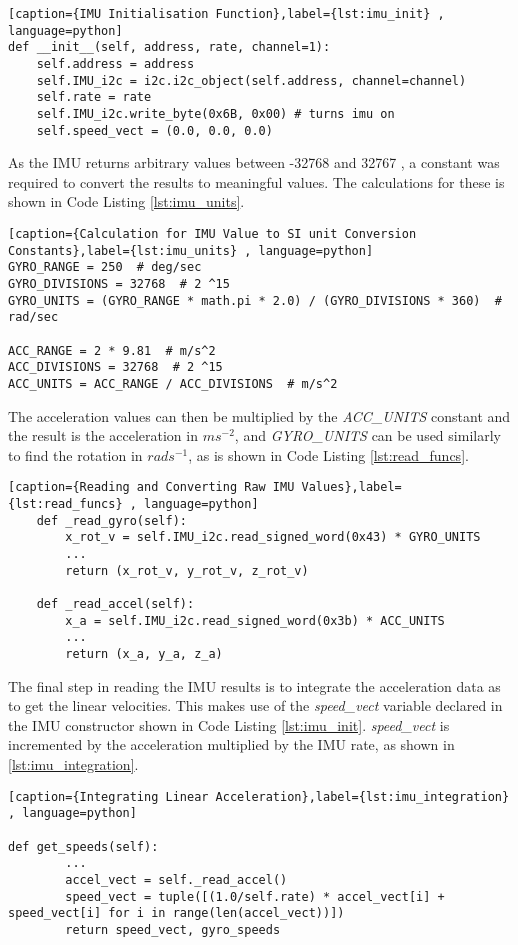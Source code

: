 \begin{lstlisting}[caption={IMU Initialisation Function},label={lst:imu_init} , language=python]
def __init__(self, address, rate, channel=1):
    self.address = address
    self.IMU_i2c = i2c.i2c_object(self.address, channel=channel)
    self.rate = rate
    self.IMU_i2c.write_byte(0x6B, 0x00) # turns imu on
    self.speed_vect = (0.0, 0.0, 0.0)
\end{lstlisting}

As the IMU returns arbitrary values between -32768 and 32767 , a constant was required to convert the results to meaningful values. The calculations for these is shown in Code Listing \ref{lst:imu_units}. 

\begin{lstlisting}[caption={Calculation for IMU Value to SI unit Conversion Constants},label={lst:imu_units} , language=python]
GYRO_RANGE = 250  # deg/sec
GYRO_DIVISIONS = 32768  # 2 ^15
GYRO_UNITS = (GYRO_RANGE * math.pi * 2.0) / (GYRO_DIVISIONS * 360)  # rad/sec

ACC_RANGE = 2 * 9.81  # m/s^2
ACC_DIVISIONS = 32768  # 2 ^15
ACC_UNITS = ACC_RANGE / ACC_DIVISIONS  # m/s^2
\end{lstlisting}

The acceleration values can then be multiplied by the \textit{ACC\_UNITS} constant and the result is the acceleration in $ms^{-2}$, and \textit{GYRO\_UNITS} can be used similarly to find the rotation in $rads^{-1}$, as is shown in Code Listing \ref{lst:read_funcs}. 


\begin{lstlisting}[caption={Reading and Converting Raw IMU Values},label={lst:read_funcs} , language=python]
    def _read_gyro(self):
        x_rot_v = self.IMU_i2c.read_signed_word(0x43) * GYRO_UNITS
		...
        return (x_rot_v, y_rot_v, z_rot_v)

    def _read_accel(self):
        x_a = self.IMU_i2c.read_signed_word(0x3b) * ACC_UNITS
		...
        return (x_a, y_a, z_a)
\end{lstlisting}

The final step in reading the IMU results is to integrate the acceleration data as to get the linear velocities. This makes use of the \textit{speed\_vect} variable declared in the IMU constructor shown in Code Listing \ref{lst:imu_init}. \textit{speed\_vect} is incremented by the acceleration multiplied by the IMU rate, as shown in \ref{lst:imu_integration}.

\begin{lstlisting}[caption={Integrating Linear Acceleration},label={lst:imu_integration} , language=python]

def get_speeds(self):
		...
        accel_vect = self._read_accel()
        speed_vect = tuple([(1.0/self.rate) * accel_vect[i] + speed_vect[i] for i in range(len(accel_vect))])
        return speed_vect, gyro_speeds
\end{lstlisting}


